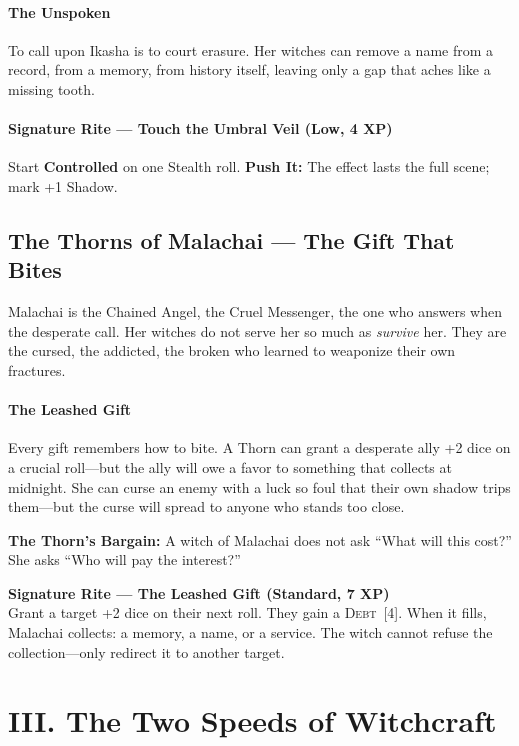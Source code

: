 \documentclass[11pt,letterpaper]{article}
\newcommand{\term}[1]{\textbf{#1}}
\newcommand{\timer}[2]{\textsc{#1}~[#2]}
\begin{document}
\paragraph{The Unspoken} To call upon Ikasha is to court erasure. Her witches can remove a name from a record, from a memory, from history itself, leaving only a gap that aches like a missing tooth.

\paragraph{Signature Rite --- Touch the Umbral Veil (Low, 4 XP)}
Start \term{Controlled} on one Stealth roll. \textbf{Push It:} The effect lasts the full scene; mark +1 Shadow.

\subsection{The Thorns of Malachai --- The Gift That Bites}

Malachai is the Chained Angel, the Cruel Messenger, the one who answers when the desperate call. Her witches do not serve her so much as \textit{survive} her. They are the cursed, the addicted, the broken who learned to weaponize their own fractures.

\paragraph{The Leashed Gift} Every gift remembers how to bite. A Thorn can grant a desperate ally +2 dice on a crucial roll---but the ally will owe a favor to something that collects at midnight. She can curse an enemy with a luck so foul that their own shadow trips them---but the curse will spread to anyone who stands too close.

\begin{warning}
\textbf{The Thorn's Bargain:} A witch of Malachai does not ask ``What will this cost?'' She asks ``Who will pay the interest?''

\medskip
\noindent\textbf{Signature Rite --- The Leashed Gift (Standard, 7 XP)} \\
Grant a target +2 dice on their next roll. They gain a \timer{Debt}{4}. When it fills, Malachai collects: a memory, a name, or a service. The witch cannot refuse the collection---only redirect it to another target.
\end{warning}

\section{III. The Two Speeds of Witchcraft}
\end{document}

